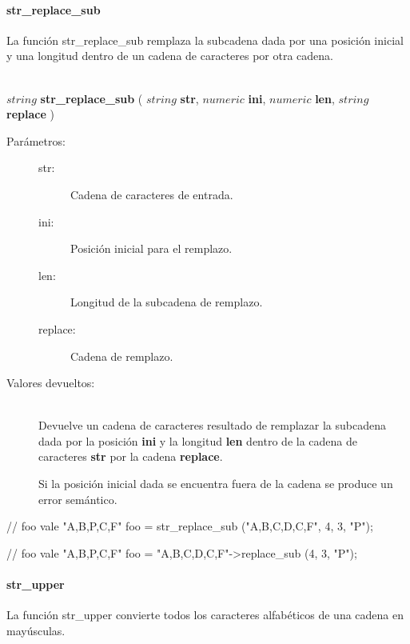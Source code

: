 \paragraph{str\_replace\_sub}
La función str\_replace\_sub remplaza la subcadena dada por una posición inicial y una longitud dentro de un cadena de caracteres por otra cadena.

\begin{framed}
\hfill \\ $string$ \textbf{str\_replace\_sub} ( $string$ \textbf{str}, $numeric$ \textbf{ini}, $numeric$ \textbf{len}, $string$ \textbf{replace} )  
\begin{description}
\item [Parámetros:] \hfill 
   \begin{description}
   \item[str:] Cadena de caracteres de entrada.
   \item[ini:] Posición inicial para el remplazo.
   \item[len:] Longitud de la subcadena de remplazo.
   \item[replace:] Cadena de remplazo.
   \end{description}
\item[Valores devueltos:] \hfill \\
   Devuelve un cadena de caracteres resultado de remplazar la subcadena dada por la posición \textbf{ini} y la longitud
   \textbf{len} dentro de la cadena de caracteres \textbf{str} por la cadena \textbf{replace}.
   
   Si la posición inicial dada se encuentra fuera de la cadena se produce un error semántico.
\end{description}
\end{framed}

\begin{myverbatim}
   // foo vale "A,B,P,C,F" 
   foo = str_replace_sub ("A,B,C,D,C,F", 4, 3, "P"); 
   
   // foo vale "A,B,P,C,F" 
   foo = "A,B,C,D,C,F"->replace_sub (4, 3, "P");
\end{myverbatim}

\paragraph{str\_upper}
La función str\_upper convierte todos los caracteres alfabéticos de una cadena en mayúsculas. 

